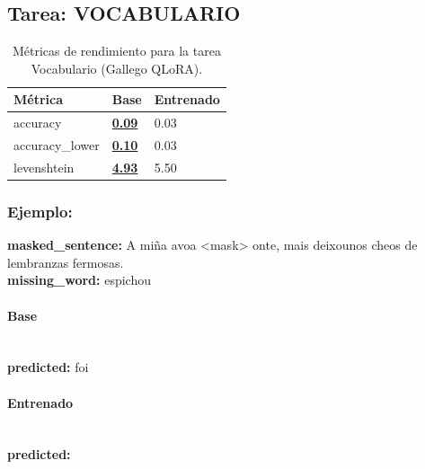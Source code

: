 \subsection{Tarea: VOCABULARIO}\label{tarea-vocabulario}
\begin{longtable}[]{@{}lll@{}}
\toprule\noalign{}
Métrica & Base & Entrenado \\
\midrule\noalign{}
\endhead
\bottomrule\noalign{}
\caption{Métricas de rendimiento para la tarea Vocabulario (Gallego QLoRA).}
\label{tab:metricas_vocabulario_Gallego QLoRA}
\endlastfoot
accuracy & \textbf{\underline{0.09}} & 0.03 \\
accuracy\_lower & \textbf{\underline{0.10}} & 0.03 \\
levenshtein & \textbf{\underline{4.93}} & 5.50 \\
\end{longtable}

\subsubsection{Ejemplo:}
\textbf{masked\_sentence:} A miña avoa {\textless}mask{\textgreater} onte, mais deixounos cheos de lembranzas fermosas.\\
\textbf{missing\_word:} espichou

\paragraph{Base}~\\
\textbf{predicted:} foi

\paragraph{Entrenado}~\\
\textbf{predicted:} 

